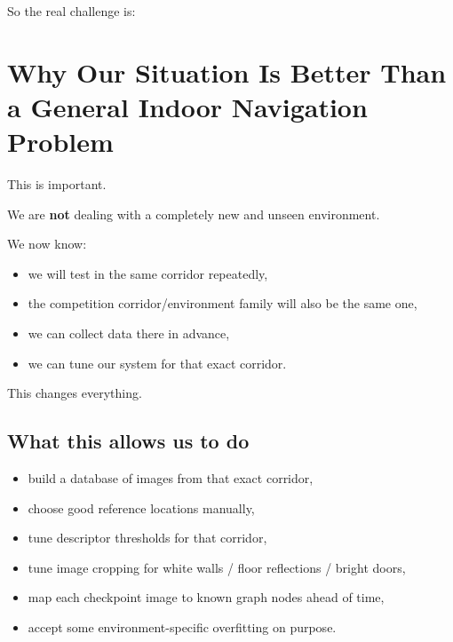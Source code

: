 \documentclass[11pt,a4paper]{article}
\begin{document}
So the real challenge is:

\begin{center}
\end{center}


\section{Why Our Situation Is Better Than a General Indoor Navigation Problem}

This is important.

We are \textbf{not} dealing with a completely new and unseen environment.

We now know:

\begin{itemize}[nosep]
  \item we will test in the same corridor repeatedly,
  \item the competition corridor/environment family will also be the same one,
  \item we can collect data there in advance,
  \item we can tune our system for that exact corridor.
\end{itemize}

This changes everything.

\subsection*{What this allows us to do}

\begin{itemize}[nosep]
  \item build a database of images from that exact corridor,
  \item choose good reference locations manually,
  \item tune descriptor thresholds for that corridor,
  \item tune image cropping for white walls / floor reflections / bright doors,
  \item map each checkpoint image to known graph nodes ahead of time,
  \item accept some environment-specific overfitting on purpose.
\end{itemize}
\end{document}
